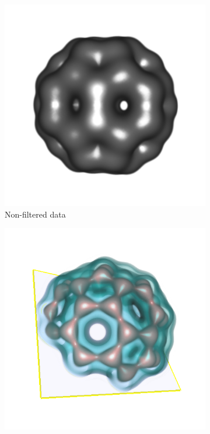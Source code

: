 \documentclass{article}
\begin{document}
\begin{figure}
	\centering
	\begin{subfigure}[h]{0.2\textwidth}
		\includegraphics[width=\textwidth]{base-vis.png}
		\caption{Non-filtered data}
		\label{fig:base}
	\end{subfigure}
	\begin{subfigure}[h]{0.2\textwidth}
		\includegraphics[width=\textwidth]{bondings.png}

\end{subfigure}
\end{figure}
\end{document}
